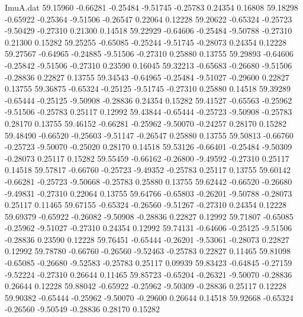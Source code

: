 \begin{filecontents}{ImuA.dat}
  59.15960   -0.66281   -0.25484   -9.51745   -0.25783    0.24354    0.16808
  59.18298   -0.65922   -0.25364   -9.51506   -0.26547    0.22064    0.12228
  59.20622   -0.65324   -0.25723   -9.50429   -0.27310    0.21300    0.14518
  59.22929   -0.64606   -0.25484   -9.50788   -0.27310    0.21300    0.15282
  59.25255   -0.65085   -0.25244   -9.51745   -0.28073    0.24354    0.12228
  59.27567   -0.64965   -0.24885   -9.51506   -0.27310    0.25880    0.13755
  59.29893   -0.64606   -0.25842   -9.51506   -0.27310    0.23590    0.16045
  59.32213   -0.65683   -0.26680   -9.51506   -0.28836    0.22827    0.13755
  59.34543   -0.64965   -0.25484   -9.51027   -0.29600    0.22827    0.13755
  59.36875   -0.65324   -0.25125   -9.51745   -0.27310    0.25880    0.14518
  59.39289   -0.65444   -0.25125   -9.50908   -0.28836    0.24354    0.15282
  59.41527   -0.65563   -0.25962   -9.51506   -0.25783    0.25117    0.12992
  59.43844   -0.65444   -0.25723   -9.50908   -0.25783    0.28170    0.13755
  59.46152   -0.66281   -0.25962   -9.50070   -0.24257    0.28170    0.15282
  59.48490   -0.66520   -0.25603   -9.51147   -0.26547    0.25880    0.13755
  59.50813   -0.66760   -0.25723   -9.50070   -0.25020    0.28170    0.14518
  59.53126   -0.66401   -0.25484   -9.50309   -0.28073    0.25117    0.15282
  59.55459   -0.66162   -0.26800   -9.49592   -0.27310    0.25117    0.14518
  59.57817   -0.66760   -0.25723   -9.49352   -0.25783    0.25117    0.13755
  59.60142   -0.66281   -0.25723   -9.50668   -0.25783    0.25880    0.13755
  59.62442   -0.66520   -0.26680   -9.49831   -0.27310    0.22064    0.13755
  59.64766   -0.65803   -0.26201   -9.50788   -0.28073    0.25117    0.11465
  59.67155   -0.65324   -0.26560   -9.51267   -0.27310    0.24354    0.12228
  59.69379   -0.65922   -0.26082   -9.50908   -0.28836    0.22827    0.12992
  59.71807   -0.65085   -0.25962   -9.51027   -0.27310    0.24354    0.12992
  59.74131   -0.64606   -0.25125   -9.51506   -0.28836    0.23590    0.12228
  59.76451   -0.65444   -0.26201   -9.53061   -0.28073    0.22827    0.12992
  59.78780   -0.66760   -0.26560   -9.52463   -0.25783    0.22827    0.11465
  59.81098   -0.65085   -0.26680   -9.52583   -0.25783    0.25117    0.09939
  59.83423   -0.64845   -0.27159   -9.52224   -0.27310    0.26644    0.11465
  59.85723   -0.65204   -0.26321   -9.50070   -0.28836    0.26644    0.12228
  59.88042   -0.65922   -0.25962   -9.50309   -0.28836    0.25117    0.12228
  59.90382   -0.65444   -0.25962   -9.50070   -0.29600    0.26644    0.14518
  59.92668   -0.65324   -0.26560   -9.50549   -0.28836    0.28170    0.15282

\end{filecontents}
